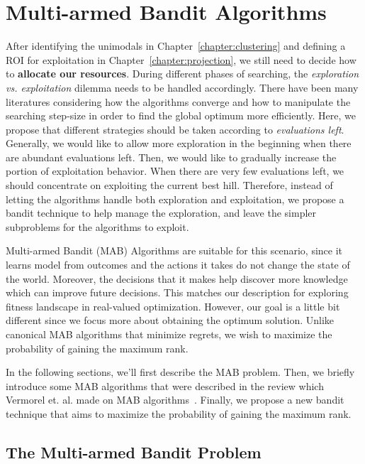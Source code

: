 \chapter{Multi-armed Bandit Algorithms}
\label{chapter:MAB}

After identifying the unimodals in Chapter~\ref{chapter:clustering} and defining a ROI for exploitation in Chapter~\ref{chapter:projection},
we still need to decide how to \textbf{allocate our resources}.
During different phases of searching, the \textit{exploration vs. exploitation} dilemma needs to be handled accordingly.
There have been many literatures considering how the algorithms converge 
and how to manipulate the searching step-size in order to find the global optimum more efficiently.
Here, we propose that different strategies should be taken according to \textit{evaluations left}.
Generally, we would like to allow more exploration in the beginning when there are abundant evaluations left.
Then, we would like to gradually increase the portion of exploitation behavior.
When there are very few evaluations left, we should concentrate on exploiting the current best hill.
Therefore, instead of letting the algorithms handle both exploration and exploitation, we propose a bandit technique to help manage the exploration, and leave the simpler subproblems for the algorithms to exploit.

Multi-armed Bandit (MAB) Algorithms are suitable for this scenario, 
since it learns model from outcomes and the actions it takes do not change the state of the world.
Moreover, the decisions that it makes help discover more knowledge which can improve future decisions.
This matches our description for exploring fitness landscape in real-valued optimization.
However, our goal is a little bit different since we focus more about obtaining the optimum solution.
Unlike canonical MAB algorithms that minimize regrets, we wish to maximize the probability of gaining the maximum rank.

In the following sections, we'll first describe the MAB problem.
Then, we briefly introduce some MAB algorithms 
that were described in the review which Vermorel et. al. made on MAB algorithms~\cite{Vermorel:2005:MAB}.
Finally, we propose a new bandit technique that aims to maximize the probability of gaining the maximum rank.


\section{The Multi-armed Bandit Problem}

